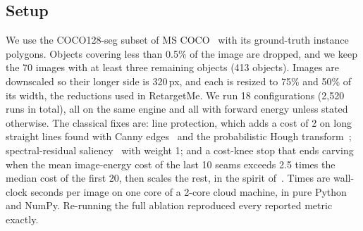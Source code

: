 \documentclass[conference]{IEEEtran}
\begin{document}
\subsection{Setup}
We use the COCO128-seg subset of MS COCO~\cite{lin2014coco} with its ground-truth instance polygons. Objects covering less than 0.5\% of the image are dropped, and we keep the 70 images with at least three remaining objects (413 objects). Images are downscaled so their longer side is 320\,px, and each is resized to 75\% and 50\% of its width, the reductions used in RetargetMe. We run 18 configurations (2,520 runs in total), all on the same engine and all with forward energy unless stated otherwise. The classical fixes are: line protection, which adds a cost of 2 on long straight lines found with Canny edges~\cite{canny1986} and the probabilistic Hough transform~\cite{matas2000hough}; spectral-residual saliency~\cite{hou2007saliency} with weight 1; and a cost-knee stop that ends carving when the mean image-energy cost of the last 10 seams exceeds 2.5 times the median cost of the first 20, then scales the rest, in the spirit of~\cite{dong2009optimized}. Times are wall-clock seconds per image on one core of a 2-core cloud machine, in pure Python and NumPy. Re-running the full ablation reproduced every reported metric exactly.
\end{document}

